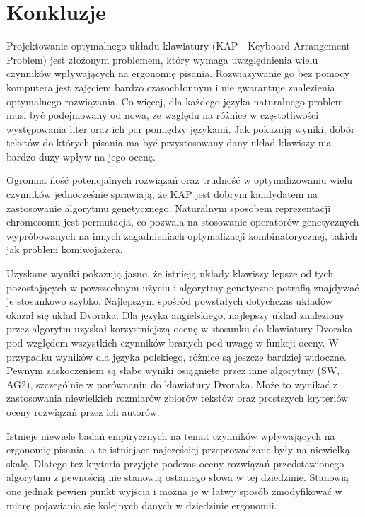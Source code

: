 \documentclass{xmgr}
\begin{document}
\summary

\section{Konkluzje}

Projektowanie optymalnego układu klawiatury (KAP - Keyboard Arrangement Problem) jest złożonym problemem, który wymaga uwzględnienia wielu czynników wpływających na ergonomię pisania. Rozwiązywanie go bez pomocy komputera jest zajęciem bardzo czasochłonnym i nie gwarantuje znalezienia optymalnego rozwiązania. Co więcej, dla każdego języka naturalnego problem musi być podejmowany od nowa, ze względu na różnice w częstotliwości występowania liter oraz ich par pomiędzy językami. Jak pokazują wyniki, dobór tekstów do których pisania ma być przystosowany dany układ klawiszy ma bardzo duży wpływ na jego ocenę.

Ogromna ilość potencjalnych rozwiązań oraz trudność w optymalizowaniu wielu czynników jednocześnie sprawiają, że KAP jest dobrym kandydatem na zastosowanie algorytmu genetycznego. Naturalnym sposobem reprezentacji chromosomu jest permutacja, co pozwala na stosowanie operatorów genetycznych wypróbowanych na innych zagadnieniach optymalizacji kombinatorycznej, takich jak problem komiwojażera.

Uzyskane wyniki pokazują jasno, że istnieją układy klawiszy lepsze od tych pozostających w powszechnym użyciu i algorytmy genetyczne potrafią znajdywać je stosunkowo szybko. Najlepszym spośród powstałych dotychczas układów okazał się układ Dvoraka. Dla języka angielskiego, najlepszy układ znaleziony przez algorytm uzyskał korzystniejszą ocenę w stosunku do klawiatury Dvoraka pod względem wszystkich czynników branych pod uwagę w funkcji oceny. W przypadku wyników dla języka polskiego, różnice są jeszcze bardziej widoczne. Pewnym zaskoczeniem są słabe wyniki osiągnięte przez inne algorytmy (SW, AG2), szczególnie w porównaniu do klawiatury Dvoraka. Może to wynikać z zastosowania niewielkich rozmiarów zbiorów tekstów oraz prostszych kryteriów oceny rozwiązań przez ich autorów.

Istnieje niewiele badań empirycznych na temat czynników wpływających na ergonomię pisania, a te istniejące najczęściej przeprowadzane były na niewielką skalę. Dlatego też kryteria przyjęte podczas oceny rozwiązań przedstawionego algorytmu z pewnością nie stanowią ostaniego słowa w tej dziedzinie. Stanowią one jednak pewien punkt wyjścia i można je w łatwy sposób zmodyfikować w miarę pojawiania się kolejnych danych w dziedzinie ergonomii.
\end{document}
